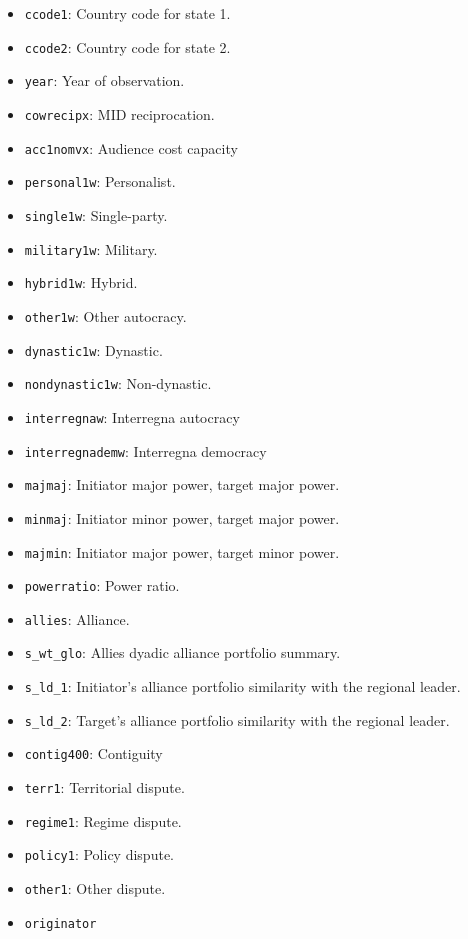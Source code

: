 \documentclass[12pt]{article}
\begin{document}
\begin{itemize}
  \item \texttt{ccode1}: Country code for state 1.
  \item \texttt{ccode2}: Country code for state 2.
  \item \texttt{year}: Year of observation.
  \item \texttt{cowrecipx}: MID reciprocation.
  \item \texttt{acc1nomvx}: Audience cost capacity
  \item \texttt{personal1w}: Personalist.
  \item \texttt{single1w}: Single-party.
  \item \texttt{military1w}: Military.
  \item \texttt{hybrid1w}: Hybrid.
  \item \texttt{other1w}: Other autocracy.
  \item \texttt{dynastic1w}: Dynastic.
  \item \texttt{nondynastic1w}: Non-dynastic.
  \item \texttt{interregnaw}: Interregna autocracy
  \item \texttt{interregnademw}: Interregna democracy
  \item \texttt{majmaj}: Initiator major power, target major power.
  \item \texttt{minmaj}: Initiator minor power, target major power.
  \item \texttt{majmin}: Initiator major power, target minor power.
  \item \texttt{powerratio}: Power ratio.
  \item \texttt{allies}: Alliance.
  \item \texttt{s\_wt\_glo}: Allies dyadic alliance portfolio summary.
  \item \texttt{s\_ld\_1}: Initiator's alliance portfolio similarity with the regional leader.
  \item \texttt{s\_ld\_2}: Target's alliance portfolio similarity with the regional leader.
  \item \texttt{contig400}: Contiguity
  \item \texttt{terr1}: Territorial dispute.
  \item \texttt{regime1}: Regime dispute.
  \item \texttt{policy1}: Policy dispute.
  \item \texttt{other1}: Other dispute.
  \item \texttt{originator}
  \end{itemize}
\end{document}
